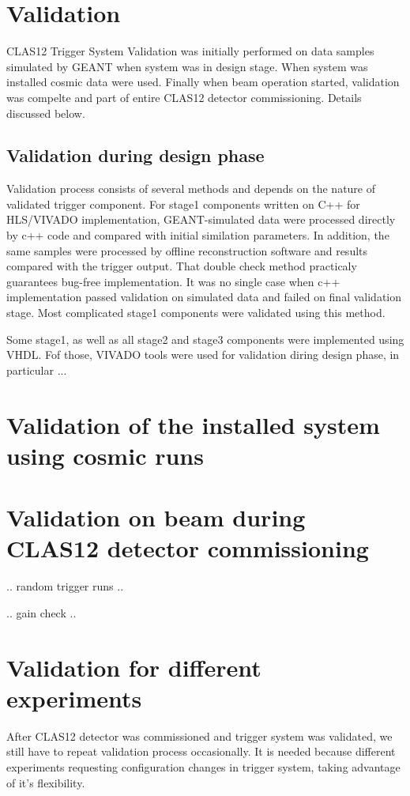 \section{Validation}

CLAS12 Trigger System Validation was initially performed on data samples simulated by GEANT when system was in design stage. When system was installed cosmic data were used. Finally when beam operation started, validation was compelte and part of entire CLAS12 detector commissioning. Details discussed below.

\subsection{Validation during design phase}

Validation process consists of several methods and depends on the nature of validated trigger component. For stage1 components written on C++ for HLS/VIVADO implementation, GEANT-simulated data were processed directly by c++ code and compared with initial similation parameters. In addition, the same samples were processed by offline reconstruction software and results compared with the trigger output. That double check method practicaly guarantees bug-free implementation. It was no single case when c++ implementation passed validation on simulated data and failed on final validation stage. Most complicated stage1 components were validated using this method.

Some stage1, as well as all stage2 and stage3 components were implemented using VHDL. Fof those, VIVADO tools were used for validation diring design phase, in particular ...

\section{Validation of the installed system using cosmic runs}

\section{Validation on beam during CLAS12 detector commissioning}

.. random trigger runs ..

.. gain check ..


\section{Validation for different experiments}

After CLAS12 detector was commissioned and trigger system was validated, we still have to repeat validation process occasionally. It is needed because different experiments requesting configuration changes in trigger system, taking advantage of it's flexibility.